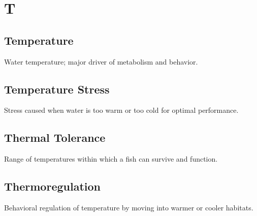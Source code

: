 \documentclass[
]{book}
\begin{document}
\section*{T}\label{t}

\subsection{\texorpdfstring{\textbf{Temperature}}{Temperature}}\label{temperature}

Water temperature; major driver of metabolism and behavior.

\subsection{\texorpdfstring{\textbf{Temperature Stress}}{Temperature Stress}}\label{temperature-stress}

Stress caused when water is too warm or too cold for optimal performance.

\subsection{\texorpdfstring{\textbf{Thermal Tolerance}}{Thermal Tolerance}}\label{thermal-tolerance}

Range of temperatures within which a fish can survive and function.

\subsection{\texorpdfstring{\textbf{Thermoregulation}}{Thermoregulation}}\label{thermoregulation}

Behavioral regulation of temperature by moving into warmer or cooler habitats.


\end{document}
